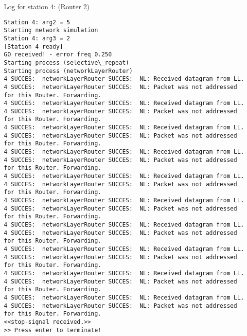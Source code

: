 Log for station 4: (Router 2)
\begin{lstlisting}[breaklines=true]
Station 4: arg2 = 5
Starting network simulation
Station 4: arg3 = 2
[Station 4 ready]
GO received! - error freq 0.250
Starting process (selective\_repeat)
Starting process (networkLayerRouter)
4 SUCCES:  networkLayerRouter SUCCES:  NL: Received datagram from LL.
4 SUCCES:  networkLayerRouter SUCCES:  NL: Packet was not addressed for this Router. Forwarding.
4 SUCCES:  networkLayerRouter SUCCES:  NL: Received datagram from LL.
4 SUCCES:  networkLayerRouter SUCCES:  NL: Packet was not addressed for this Router. Forwarding.
4 SUCCES:  networkLayerRouter SUCCES:  NL: Received datagram from LL.
4 SUCCES:  networkLayerRouter SUCCES:  NL: Packet was not addressed for this Router. Forwarding.
4 SUCCES:  networkLayerRouter SUCCES:  NL: Received datagram from LL.
4 SUCCES:  networkLayerRouter SUCCES:  NL: Packet was not addressed for this Router. Forwarding.
4 SUCCES:  networkLayerRouter SUCCES:  NL: Received datagram from LL.
4 SUCCES:  networkLayerRouter SUCCES:  NL: Packet was not addressed for this Router. Forwarding.
4 SUCCES:  networkLayerRouter SUCCES:  NL: Received datagram from LL.
4 SUCCES:  networkLayerRouter SUCCES:  NL: Packet was not addressed for this Router. Forwarding.
4 SUCCES:  networkLayerRouter SUCCES:  NL: Received datagram from LL.
4 SUCCES:  networkLayerRouter SUCCES:  NL: Packet was not addressed for this Router. Forwarding.
4 SUCCES:  networkLayerRouter SUCCES:  NL: Received datagram from LL.
4 SUCCES:  networkLayerRouter SUCCES:  NL: Packet was not addressed for this Router. Forwarding.
4 SUCCES:  networkLayerRouter SUCCES:  NL: Received datagram from LL.
4 SUCCES:  networkLayerRouter SUCCES:  NL: Packet was not addressed for this Router. Forwarding.
4 SUCCES:  networkLayerRouter SUCCES:  NL: Received datagram from LL.
4 SUCCES:  networkLayerRouter SUCCES:  NL: Packet was not addressed for this Router. Forwarding.
<<stop-signal received.>>
>> Press enter to terminate!
\end{lstlisting}

